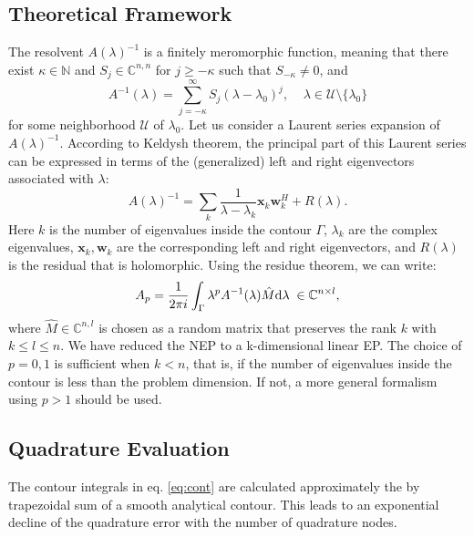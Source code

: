 \documentclass[11pt,letterpaper]{article}
\begin{document}
\subsection{Theoretical Framework}
The resolvent $A(\lambda)^{-1}$ is a finitely meromorphic function, meaning that there exist $\kappa\in\mathbb{N}$ and $S_j\in \mathbb{C}^{n,n}$ for $j\geq -\kappa$ such that $S_{-\kappa}\neq 0$, and 
\begin{equation}\label{eq:Ainv}
A^{-1}(\lambda)=\sum\limits_{j=-\kappa}^{\infty} S_j (\lambda-\lambda_0)^j,\;\;
\;\; \lambda \in \mathcal{U} \setminus \lbrace\lambda_0 \rbrace 
\end{equation}
for some neighborhood $\mathcal{U}$ of $\lambda_0$. Let us consider a Laurent series expansion of $A(\lambda)^{-1}$. According to Keldysh theorem, \citep{keldysh1951characteristic, beyn_integral_2012} the principal part of this Laurent series can be expressed in terms of the (generalized) left and right eigenvectors associated with $\lambda$:
\begin{equation}
\label{eq:Keldysh}
A(\lambda)^{-1} = \sum\limits_{k}\frac{1}{\lambda-\lambda_k}\mathbf{x}_k\mathbf{w}_k^H + R(\lambda).
\end{equation}
Here $k$ is the number of eigenvalues inside the contour $\Gamma$, $\lambda_k$ are the complex eigenvalues, $\mathbf{x}_k, \mathbf{w}_k$ are the corresponding left and right eigenvectors, and $R(\lambda)$ is the residual that is holomorphic. Using the residue theorem, we can write: 
\begin{equation}\label{eq:cont}
A_{p} = \frac{1}{2\pi i}\int_{\Gamma}\lambda^p A^{-1}(\lambda)\hat{M} \mathrm{d}\lambda \;\in\mathbb{C}^{n \times l},
\end{equation}
where $\hat{M} \in \mathbb{C}^{n,l}$ is chosen as a random matrix that preserves the rank $k$ with $k \leq l \leq n$. We have reduced the NEP to a k-dimensional linear EP. The choice of $p=0,1$ is sufficient when $k<n$, that is, if the number of eigenvalues inside the contour is less than the problem dimension. If not, a more general formalism using $p > 1$ should be used. \citep{beyn_integral_2012}

\subsection{Quadrature Evaluation}
The contour integrals in eq. \ref{eq:cont} are calculated approximately the by trapezoidal sum of a smooth analytical contour. This leads to an exponential decline of the quadrature error with the number of quadrature nodes.
\end{document}
